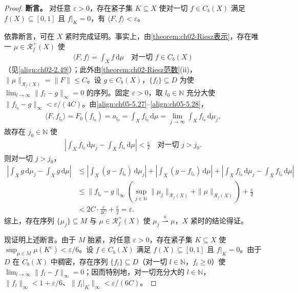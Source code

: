 \documentclass[../../main.tex]{subfiles}%
\begin{document}
\begin{proof}
\textbf{断言。} 对任意 $\varepsilon>0$，存在紧子集 $K\subseteq X$ 使对一切 $f\in C_b(X)$ 满足 $f(X)\subseteq[0,1]$ 且 $f|_K=0$，有 $\langle F,f\rangle<\varepsilon$。

依靠断言，可在 $X$ 紧时完成证明。事实上，由\cref{theorem:ch02-Riesz表示}，存在唯一 $\mu\in\mathscr{R}^+_f(X)$ 使
\begin{align}
\langle F,f\rangle=\int_X f\,\mathrm{d}\mu
\quad\text{对一切 }f\in C_b(X)\label{align:ch05-5.28}
\end{align}
（见\eqref{align:ch02-2.49}）；此外由\cref{theorem:ch02-Riesz范数}(ii)，$\|\mu\|_{\mathscr{R}_f(X)}=\|F\|\leqslant C$。设 $g\in C_b(X)$，$\{f_l\}\subseteq D$ 为使 $\lim_{l\to\infty}\|f_l-g\|_\infty=0$ 的序列。固定 $\varepsilon>0$，取 $l_0\in\mathbb{N}$ 充分大使 $\|f_{l_0}-g\|_\infty<\varepsilon/(4C)$。由\eqref{align:ch05-5.27}–\eqref{align:ch05-5.28}，
\begin{align*}
\langle F,f_{l_0}\rangle=F_0(f_{l_0})=a_{l_0}
=\int_X f_{l_0}\,\mathrm{d}\mu
=\lim_{j\to\infty}\int_X f_{l_0}\,\mathrm{d}\mu_j,
\end{align*}
故存在 $j_0\in\mathbb{N}$ 使
\begin{align*}
\left|\int_X f_{l_0}\,\mathrm{d}\mu_j-\int_X f_{l_0}\,\mathrm{d}\mu\right|<\frac{\varepsilon}{2}
\quad\text{对一切 }j>j_0.
\end{align*}
则对一切 $j>j_0$，
\begin{align*}
\left|\int_X g\,\mathrm{d}\mu_j-\int_X g\,\mathrm{d}\mu\right|
&\leqslant\left|\int_X(g-f_{l_0})\,\mathrm{d}\mu_j\right|
+\left|\int_X(g-f_{l_0})\,\mathrm{d}\mu\right|
+\left|\int_X f_{l_0}\,\mathrm{d}\mu_j-\int_X f_{l_0}\,\mathrm{d}\mu\right|\\
&\leqslant\|f_{l_0}-g\|_\infty\left(\sup_{j\in\mathbb{N}}\|\mu_j\|_{\mathscr{R}_f(X)}+\|\mu\|_{\mathscr{R}_f(X)}\right)+\frac{\varepsilon}{2}\\
&<2C\cdot\frac{\varepsilon}{4C}+\frac{\varepsilon}{2}=\varepsilon.
\end{align*}
综上，存在序列 $\{\mu_j\}\subseteq M$ 与 $\mu\in\mathscr{R}^+_f(X)$ 使 $\mu_j\stackrel{n}{\rightharpoonup}\mu$，$X$ 紧时的结论得证。

现证明上述断言。由于 $M$ 胎紧，对任意 $\varepsilon>0$，存在紧子集 $K\subseteq X$ 使 $\sup_{\mu\in M}\mu(K^c)<\varepsilon/6$。设 $f\in C_b(X)$ 满足 $f(X)\subseteq[0,1]$ 且 $f|_K=0$。由于 $D$ 在 $C_b(X)$ 中稠密，存在序列 $\{f_l\}\subseteq D$（对一切 $l\in\mathbb{N}$，$f_l\geqslant0$）使 $\lim_{l\to\infty}\|f_l-f\|_\infty=0$；因而特别地，对一切充分大的 $l\in\mathbb{N}$，$\|f_l\|_\infty<1+\varepsilon/6$、$\|f_l|_K\|_\infty<\varepsilon/(6C)$。


\end{proof}
\end{document}
